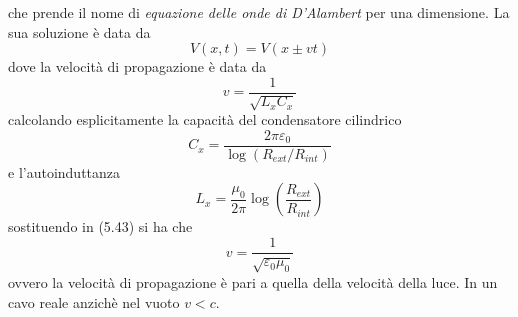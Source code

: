 che prende il nome di \textit{equazione delle onde di D'Alambert} per una dimensione.
La sua soluzione \`e data da 
\begin{equation*}
	V(x,t) = V(x \pm vt)
\end{equation*}
dove la velocit\`a di propagazione \`e data da
\begin{equation}
	v = \frac{1}{\sqrt{L_x C_x}} 
\end{equation}
calcolando esplicitamente la capacit\`a del condensatore cilindrico
\begin{equation*}
	C_x = \frac{2 \pi \varepsilon_0}{\log(R_{ext}/R_{int})}
\end{equation*}
e l'autoinduttanza 
\begin{equation*}
	L_x = \frac{\mu_0}{2 \pi} \log \left( \frac{R_{ext}}{R_{int}}\right)
\end{equation*}
sostituendo in (5.43) si ha che 
\begin{equation*}
	v = \frac{1}{\sqrt{\varepsilon_0 \mu_0}}
\end{equation*}
ovvero la velocit\`a di propagazione \`e pari a quella della velocit\`a della luce. In un cavo reale anzich\`e nel vuoto $v < c$.








